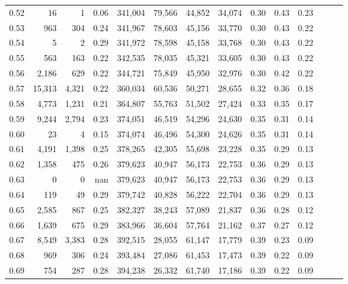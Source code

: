 \begin{tabular}{rrrrrrrrrrrrrr}
0.52 &      16 &      1 &  0.06 &  341,004 &   79,566 &  44,852 &  34,074 &  0.30 &  0.43 &      0.23 \\
0.53 &     963 &    304 &  0.24 &  341,967 &   78,603 &  45,156 &  33,770 &  0.30 &  0.43 &      0.22 \\
0.54 &       5 &      2 &  0.29 &  341,972 &   78,598 &  45,158 &  33,768 &  0.30 &  0.43 &      0.22 \\
0.55 &     563 &    163 &  0.22 &  342,535 &   78,035 &  45,321 &  33,605 &  0.30 &  0.43 &      0.22 \\
0.56 &   2,186 &    629 &  0.22 &  344,721 &   75,849 &  45,950 &  32,976 &  0.30 &  0.42 &      0.22 \\
0.57 &  15,313 &  4,321 &  0.22 &  360,034 &   60,536 &  50,271 &  28,655 &  0.32 &  0.36 &      0.18 \\
0.58 &   4,773 &  1,231 &  0.21 &  364,807 &   55,763 &  51,502 &  27,424 &  0.33 &  0.35 &      0.17 \\
0.59 &   9,244 &  2,794 &  0.23 &  374,051 &   46,519 &  54,296 &  24,630 &  0.35 &  0.31 &      0.14 \\
0.60 &      23 &      4 &  0.15 &  374,074 &   46,496 &  54,300 &  24,626 &  0.35 &  0.31 &      0.14 \\
0.61 &   4,191 &  1,398 &  0.25 &  378,265 &   42,305 &  55,698 &  23,228 &  0.35 &  0.29 &      0.13 \\
0.62 &   1,358 &    475 &  0.26 &  379,623 &   40,947 &  56,173 &  22,753 &  0.36 &  0.29 &      0.13 \\
0.63 &       0 &      0 &   nan &  379,623 &   40,947 &  56,173 &  22,753 &  0.36 &  0.29 &      0.13 \\
0.64 &     119 &     49 &  0.29 &  379,742 &   40,828 &  56,222 &  22,704 &  0.36 &  0.29 &      0.13 \\
0.65 &   2,585 &    867 &  0.25 &  382,327 &   38,243 &  57,089 &  21,837 &  0.36 &  0.28 &      0.12 \\
0.66 &   1,639 &    675 &  0.29 &  383,966 &   36,604 &  57,764 &  21,162 &  0.37 &  0.27 &      0.12 \\
0.67 &   8,549 &  3,383 &  0.28 &  392,515 &   28,055 &  61,147 &  17,779 &  0.39 &  0.23 &      0.09 \\
0.68 &     969 &    306 &  0.24 &  393,484 &   27,086 &  61,453 &  17,473 &  0.39 &  0.22 &      0.09 \\
0.69 &     754 &    287 &  0.28 &  394,238 &   26,332 &  61,740 &  17,186 &  0.39 &  0.22 &      0.09 \\

\end{tabular}
